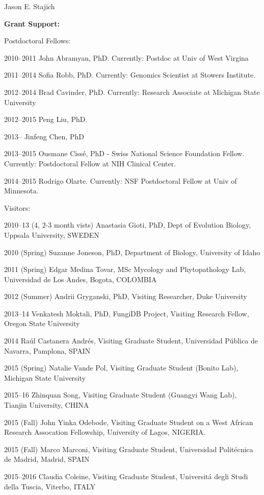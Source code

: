 \documentclass[10pt]{article}
\begin{document}
\begin{cv}{\centerline{Jason E. Stajich}}
\begin{cvlistcompact}{\bf Grant Support:}
\begin{cvlistcompact}{Postdoctoral Fellows:}
\item [2010--2011] John Abramyan, PhD. Currently: Postdoc at Univ of West
  Virgina
\item [2011--2014] Sofia Robb, PhD. Currently: Genomics Scientist at
  Stowers Institute.
\item [2012--2014] Brad Cavinder, PhD. Currently: Research Associate at Michigan
  State University
\item [2012--2015] Peng Liu, PhD. 
\item [2013--] Jinfeng Chen, PhD
\item [2013--2015] Ousmane Ciss\'{e}, PhD - Swiss National Science
  Foundation Fellow. Currently: Postdoctoral Fellow at NIH Clinical Center.
\item [2014--2015] Rodrigo Olarte. Currently: NSF Postdoctoral Fellow
  at Univ of Minnesota.
\end{cvlistcompact}

\begin{cvlistcompact}{Visitors:}
\item [2010--13 (4, 2-3 month vists)] Anastasia Gioti, PhD,
  Dept of Evolution Biology, Uppsala University, SWEDEN
\item [2010 (Spring)] Suzanne Joneson, PhD, Department of Biology, University of Idaho
\item [2011 (Spring)] Edgar Medina Tovar, MSc
  Mycology and Phytopathology Lab, Universidad de Los Andes, Bogota, COLOMBIA
\item [2012 (Summer)] Andrii Gryganski, PhD, Visiting Researcher, Duke University 
\item [2013--14] Venkatesh Moktali, PhD,
  FungiDB Project, Visiting Research Fellow, Oregon State University
\item [2014] Ra\'{u}l Castanera Andr\'{e}s, Visiting Graduate Student,
  Universidad P\'{u}blica de Navarra, Pamplona, SPAIN
\item [2015 (Spring)] Natalie Vande Pol, Visiting Graduate Student (Bonito Lab), Michigan State University
\item [2015--16] Zhinquan Song, Visiting Graduate Student (Guangyi
  Wang Lab), Tianjin University, CHINA
\item [2015 (Fall)] John Yinka Odebode, Visiting Graduate Student on a West
  African Research Assocation Fellowship, University of Lagos, NIGERIA.
\item [2015 (Fall)] Marco Marconi, Visiting Graduate Student,
    Universidad Polit\'{e}cnica de Madrid, Madrid, SPAIN
\item [2015--2016] Claudia Coleine, Visiting Graduate Student,
    Universit\'{a} degli Studi della Tuscia, Viterbo, ITALY
\end{cvlistcompact}


\end{cvlistcompact}
\end{cv}
\end{document}
